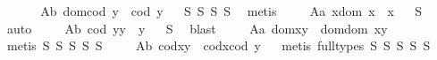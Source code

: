 \begin{isabellebody}
\endisatagproof
{\isafoldproof}%
%
\isadelimproof
%
\endisadelimproof
\ \isanewline
\ \ \ \isamarkupfalse%
\ A{}b{\isacharcolon}\ {\isachardoublequoteopen}dom{\isacharparenleft}cod\ y{\isacharparenright}\ {\isasymcong}\ cod\ y{\isachardoublequoteclose}%
\isadelimproof
\ %
\endisadelimproof
%
\isatagproof
{}\isamarkupfalse%
\ S{}\ S{}\ S{}\ S{}\ \isamarkupfalse%
\ metis%
\endisatagproof
{\isafoldproof}%
%
\isadelimproof
%
\endisadelimproof
\isanewline
\ \ \ \isamarkupfalse%
\ A{}a{\isacharcolon}\ {\isachardoublequoteopen}x{\isasymcdot}{\isacharparenleft}dom\ x{\isacharparenright}\ {\isasymcong}\ x{\isachardoublequoteclose}%
\isadelimproof
\ %
\endisadelimproof
%
\isatagproof
{}\isamarkupfalse%
\ S{}\ \isamarkupfalse%
\ auto%
\endisatagproof
{\isafoldproof}%
%
\isadelimproof
%
\endisadelimproof
\isanewline
\ \ \ \isamarkupfalse%
\ A{}b{\isacharcolon}\ {\isachardoublequoteopen}{\isacharparenleft}cod\ y{\isacharparenright}{\isasymcdot}y\ {\isasymcong}\ y{\isachardoublequoteclose}%
\isadelimproof
\ %
\endisadelimproof
%
\isatagproof
{}\isamarkupfalse%
\ S{}\ \isamarkupfalse%
\ blast%
\endisatagproof
{\isafoldproof}%
%
\isadelimproof
%
\endisadelimproof
\isanewline
\ \ \ \isamarkupfalse%
\ A{}a{\isacharcolon}\ {\isachardoublequoteopen}dom{\isacharparenleft}x{\isasymcdot}y{\isacharparenright}\ {\isasymcong}\ dom{\isacharparenleft}{\isacharparenleft}dom\ x{\isacharparenright}{\isasymcdot}y{\isacharparenright}{\isachardoublequoteclose}%
\isadelimproof
\ %
\endisadelimproof
%
\isatagproof
{}\isamarkupfalse%
\ {\isacharparenleft}metis\ S{}\ S{}\ S{}\ S{}\ S{}{\isacharparenright}%
\endisatagproof
{\isafoldproof}%
%
\isadelimproof
%
\endisadelimproof
\isanewline
\ \ \ \isamarkupfalse%
\ A{}b{\isacharcolon}\ {\isachardoublequoteopen}cod{\isacharparenleft}x{\isasymcdot}y{\isacharparenright}\ {\isasymcong}\ cod{\isacharparenleft}x{\isasymcdot}{\isacharparenleft}cod\ y{\isacharparenright}{\isacharparenright}{\isachardoublequoteclose}%
\isadelimproof
\ %
\endisadelimproof
%
\isatagproof
{}\isamarkupfalse%
\ {\isacharparenleft}metis\ {\isacharparenleft}full{\isacharunderscore}types{\isacharparenright}\ S{}\ S{}\ S{}\ S{}\ S{}{\isacharparenright}%

\end{isabellebody}
